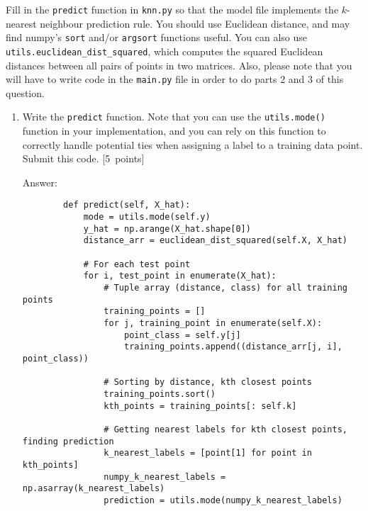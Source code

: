 \documentclass{article}
\newcommand{\blu}[1]{{\textcolor{blu}{#1}}}
\newenvironment{answer}{\par\begingroup\color{gre}Answer: }{\endgroup}
\let\ask\blu
\newcommand\pts[1]{\textcolor{pointscolour}{[#1~points]}}
\begin{document}
    Fill in the \texttt{predict} function in \texttt{knn.py} so that the model file implements the $k$-nearest neighbour prediction rule.
    You should use Euclidean distance, and may find numpy's \texttt{sort} and/or \texttt{argsort} functions useful.
    You can also use \texttt{utils.euclidean\string_dist\string_squared}, which computes the squared Euclidean distances between all pairs of points in two matrices. Also, please note that you will have to write code in the \texttt{main.py} file in order to do parts 2 and 3 of this question.
    \begin{enumerate}
        \item Write the \texttt{predict} function. Note that you can use the \texttt{utils.mode()} function in your implementation, and you can rely on this function to correctly handle potential ties when assigning a label to a training data point. \ask{Submit this code.} \pts{5}
        \begin{answer}
        \begin{verbatim}
        def predict(self, X_hat):
            mode = utils.mode(self.y)
            y_hat = np.arange(X_hat.shape[0])
            distance_arr = euclidean_dist_squared(self.X, X_hat)

            # For each test point
            for i, test_point in enumerate(X_hat):
                # Tuple array (distance, class) for all training points
                training_points = []
                for j, training_point in enumerate(self.X):
                    point_class = self.y[j]
                    training_points.append((distance_arr[j, i], point_class))

                # Sorting by distance, kth closest points
                training_points.sort()
                kth_points = training_points[: self.k]

                # Getting nearest labels for kth closest points, finding prediction
                k_nearest_labels = [point[1] for point in kth_points]
                numpy_k_nearest_labels = np.asarray(k_nearest_labels)
                prediction = utils.mode(numpy_k_nearest_labels)


\end{verbatim}
\end{answer}
\end{enumerate}
\end{document}
